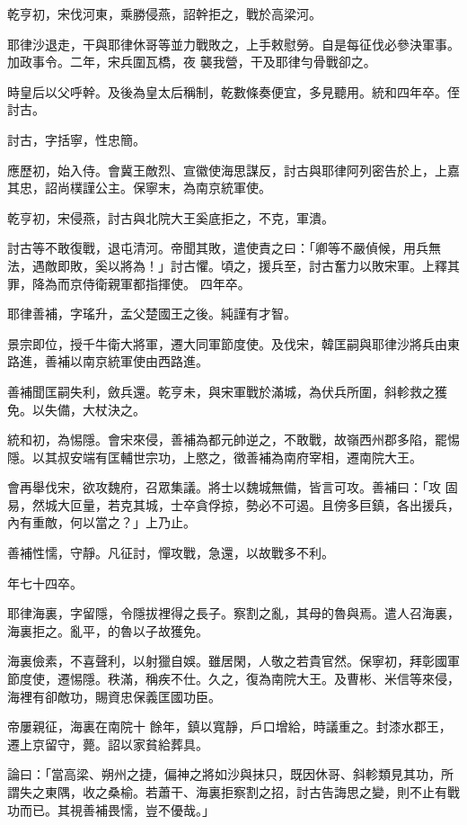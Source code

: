 \begin{pinyinscope}
 乾亨初，宋伐河東，乘勝侵燕，詔幹拒之，戰於高梁河。



 耶律沙退走，干與耶律休哥等並力戰敗之，上手敕慰勞。自是每征伐必參決軍事。加政事令。二年，宋兵圍瓦橋，夜
 襲我營，干及耶律勻骨戰卻之。



 時皇后以父呼幹。及後為皇太后稱制，乾數條奏便宜，多見聽用。統和四年卒。侄討古。



 討古，字括寧，性忠簡。



 應歷初，始入侍。會冀王敵烈、宣徽使海思謀反，討古與耶律阿列密告於上，上嘉其忠，詔尚樸謹公主。保寧末，為南京統軍使。



 乾亨初，宋侵燕，討古與北院大王奚底拒之，不克，軍潰。



 討古等不敢復戰，退屯清河。帝聞其敗，遣使責之曰：「卿等不嚴偵候，用兵無法，遇敵即敗，奚以將為！」討古懼。頃之，援兵至，討古奮力以敗宋軍。上釋其罪，降為而京侍衛親軍都指揮使。
 四年卒。



 耶律善補，字瑤升，孟父楚國王之後。純謹有才智。



 景宗即位，授千牛衛大將軍，遷大同軍節度使。及伐宋，韓匡嗣與耶律沙將兵由東路進，善補以南京統軍使由西路進。



 善補聞匡嗣失利，斂兵還。乾亨未，與宋軍戰於滿城，為伏兵所圍，斜軫救之獲免。以失備，大杖決之。



 統和初，為惕隱。會宋來侵，善補為都元帥逆之，不敢戰，故嶺西州郡多陷，罷惕隱。以其叔安端有匡輔世宗功，上愍之，徵善補為南府宰相，遷南院大王。



 會再舉伐宋，欲攻魏府，召眾集議。將士以魏城無備，皆言可攻。善補曰：「攻
 固易，然城大叵量，若克其城，士卒貪俘掠，勢必不可遏。且傍多巨鎮，各出援兵，內有重敵，何以當之？」上乃止。



 善補性懦，守靜。凡征討，憚攻戰，急還，以故戰多不利。



 年七十四卒。



 耶律海裏，字留隱，令隱拔裡得之長子。察割之亂，其母的魯與焉。遣人召海裏，海裏拒之。亂平，的魯以子故獲免。



 海裏儉素，不喜聲利，以射獵自娛。雖居閑，人敬之若貴官然。保寧初，拜彰國軍節度使，遷惕隱。秩滿，稱疾不仕。久之，復為南院大王。及曹彬、米信等來侵，海裡有卻敵功，賜資忠保義匡國功臣。



 帝屢親征，海裏在南院十
 餘年，鎮以寬靜，戶口增給，時議重之。封漆水郡王，遷上京留守，薨。詔以家貧給葬具。



 論曰：「當高梁、朔州之捷，偏神之將如沙與抹只，既因休哥、斜軫類見其功，所謂失之東隅，收之桑榆。若蕭干、海裏拒察割之招，討古告誨思之變，則不止有戰功而已。其視善補畏懦，豈不優哉。」



\end{pinyinscope}